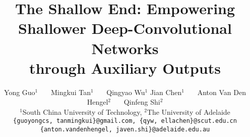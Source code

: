 \documentclass[10pt,onecolumn,letterpaper]{article}
\author{Yong Guo$^1$~~~ Mingkui Tan$^1$~~~ Qingyao Wu$^1$ Jian Chen$^1$~~~ Anton Van Den Hengel$^2$~~~ Qinfeng Shi$^2$\\
$^1$South China University of Technology, $^2$The University of Adelaide\\
{\tt\small \{guoyongcs, tanmingkui\}@gmail.com, \{qyw, ellachen\}@scut.edu.cn} \\
{\tt\small \{anton.vandenhengel, javen.shi\}@adelaide.edu.au}
}
\begin{document}
\title{The Shallow End: Empowering Shallower Deep-Convolutional Networks\\ through Auxiliary Outputs}


\maketitle
\end{document}
